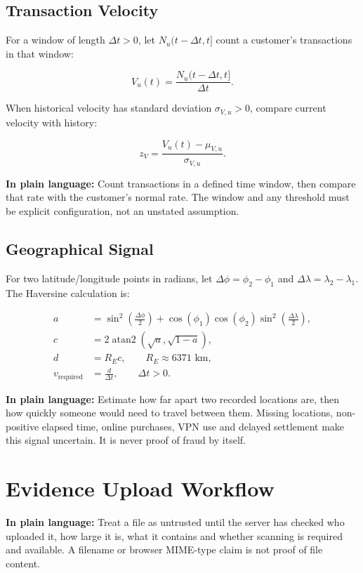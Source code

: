 \documentclass[11pt,a4paper]{article}
\begin{document}
\subsection{Transaction Velocity}

For a window of length \(\Delta t>0\), let
\(N_u(t-\Delta t,t]\) count a customer's transactions in that window:

\[
V_u(t)=\frac{N_u(t-\Delta t,t]}{\Delta t}.
\]

When historical velocity has standard deviation
\(\sigma_{V,u}>0\), compare current velocity with history:

\[
z_V=\frac{V_u(t)-\mu_{V,u}}{\sigma_{V,u}}.
\]

\textbf{In plain language:} Count transactions in a defined time
window, then compare that rate with the customer's normal rate. The
window and any threshold must be explicit configuration, not an
unstated assumption.

\subsection{Geographical Signal}

For two latitude/longitude points in radians, let
\(\Delta\phi=\phi_2-\phi_1\) and
\(\Delta\lambda=\lambda_2-\lambda_1\). The Haversine calculation is:

\begin{align*}
a &=
\sin^2\left(\frac{\Delta\phi}{2}\right)
+\cos(\phi_1)\cos(\phi_2)
\sin^2\left(\frac{\Delta\lambda}{2}\right),\\
c &=2\operatorname{atan2}\left(\sqrt{a},\sqrt{1-a}\right),\\
d &=R_Ec,
\qquad R_E\approx6371\text{ km},\\
v_{\mathrm{required}}&=\frac{d}{\Delta t},
\qquad \Delta t>0.
\end{align*}

\textbf{In plain language:} Estimate how far apart two recorded
locations are, then how quickly someone would need to travel between
them. Missing locations, non-positive elapsed time, online purchases,
VPN use and delayed settlement make this signal uncertain. It is never
proof of fraud by itself.

\section{Evidence Upload Workflow}

\textbf{In plain language:} Treat a file as untrusted until the server
has checked who uploaded it, how large it is, what it contains and
whether scanning is required and available. A filename or browser
MIME-type claim is not proof of file content.
\end{document}
